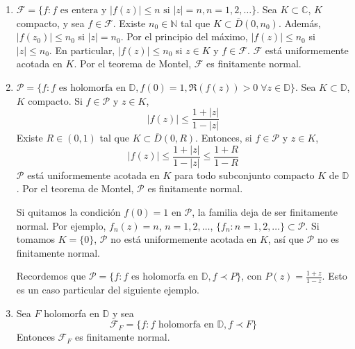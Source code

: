 \begin{example}
    \hfill
    \begin{enumerate}
        \item $\mathcal{F} = \{f : f \text{ es entera y } |f(z)| \leq n \text{ si } |z| = n, n = 1, 2, \dots\}$.
              Sea $K \subset \mathbb{C}$, $K$ compacto, y sea $f \in \mathcal{F}$.
              Existe $n_0 \in \mathbb{N}$ tal que $K \subset \overline{D}(0, n_0)$.
              Además, $|f(z_0)| \leq n_0$ si $|z| = n_0$.
              Por el principio del máximo, $|f(z)| \leq n_0$ si $|z| \leq n_0$.
              En particular, $|f(z)| \leq n_0$ si $z \in K$ y $f \in \mathcal{F}$.
              $\mathcal{F}$ está uniformemente acotada en $K$.
              Por el teorema de Montel, $\mathcal{F}$ es finitamente normal.

        \item $\mathcal{P} = \{f : f \text{ es holomorfa en } \mathbb{D}, f(0) = 1, \Re(f(z)) > 0 \; \forall z \in \mathbb{D}\}$.
              Sea $K \subset \mathbb{D}$, $K$ compacto.
              Si $f \in \mathcal{P}$ y $z \in K$,
              $$|f(z)| \leq \frac{1+|z|}{1-|z|}$$
              Existe $R \in (0, 1)$ tal que $K \subset \overline{D}(0, R)$.
              Entonces, si $f \in \mathcal{P}$ y $z \in K$,
              $$|f(z)| \leq \frac{1+|z|}{1-|z|} \leq \frac{1+R}{1-R}$$
              $\mathcal{P}$ está uniformemente acotada en $K$ para todo subconjunto compacto $K$ de $\mathbb{D}$.
              Por el teorema de Montel, $\mathcal{P}$ es finitamente normal.

              \begin{remark}
                  Si quitamos la condición $f(0) = 1$ en $\mathcal{P}$, la familia deja de ser finitamente normal.
                  Por ejemplo, $f_n(z) = n$, $n = 1, 2, \dots$, $\{f_n : n = 1, 2, \dots\} \subset \mathcal{P}$.
                  Si tomamos $K = \{0\}$, $\mathcal{P}$ no está uniformemente acotada en $K$, así que $\mathcal{P}$ no es finitamente normal.
              \end{remark}

              Recordemos que $\mathcal{P} = \{f : f \text{ es holomorfa en } \mathbb{D}, f \prec P\}$, con $P(z) = \frac{1+z}{1-z}$.
              Esto es un caso particular del siguiente ejemplo.

        \item Sea $F$ holomorfa en $\mathbb{D}$ y sea
              $$\mathcal{F}_F = \{f : f \text{ holomorfa en } \mathbb{D}, f \prec F\}$$
              Entonces $\mathcal{F}_F$ es finitamente normal.


\end{enumerate}
\end{example}
